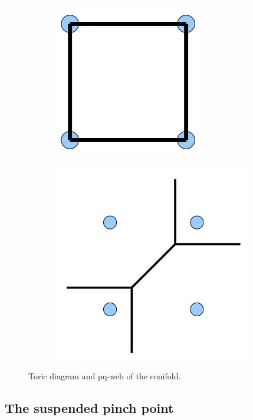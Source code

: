 \documentclass{worksheetclass}
\begin{document}
        \begin{figure}[H]
            \centering
            \begin{subfigure}[b]{0.3\textwidth}
                \centering
                \includegraphics[scale=0.4]{Pictures/conifoldtoricdiag.png}
                \label{fig:y equals x}
            \end{subfigure}
            \hspace{2cm}
            \begin{subfigure}[b]{0.3\textwidth}
                \centering
                \includegraphics[scale=0.3]{Pictures/conifoldpqweb.png}
                \label{fig:three sin x}
            \end{subfigure}
            \caption{Toric diagram and pq-web of the conifold.}
            \label{fig:Z5graphs}
        \end{figure}

    \subsection{The suspended pinch point}
\end{document}

